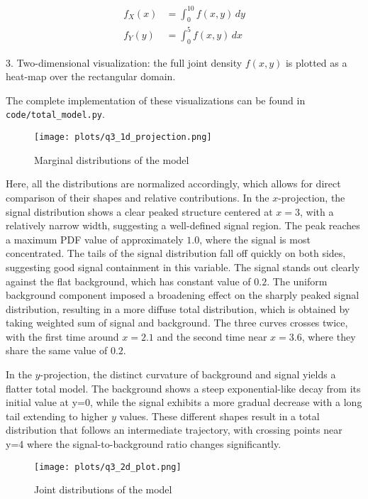 \documentclass[a4paper, 12pt]{article}
\begin{document}
   \begin{align}
   f_X(x) &= \int_0^{10} f(x,y) \, dy \\
   f_Y(y) &= \int_0^5 f(x,y) \, dx
   \end{align}
\par 
3. Two-dimensional visualization: the full joint density $f(x,y)$ is plotted as a heat-map over the rectangular domain. \par 
The complete implementation of these visualizations can be found in \texttt{code/total\_model.py}.
\begin{figure}[H]
    \centering
    \texttt{[image: plots/q3\_1d\_projection.png]}
    \caption{Marginal distributions of the model}
    \label{fig:marginal_distributions}
\end{figure}
\par Here, all the distributions are normalized accordingly, which allows for direct comparison of their shapes and relative contributions. In the $x$-projection, the signal distribution shows a clear peaked structure centered at $x=3$, with a relatively narrow width, suggesting a well-defined signal region. The peak reaches a maximum PDF value of approximately $1.0$, where the signal is most concentrated. The tails of the signal distribution fall off quickly on both sides, suggesting good signal containment in this variable. The signal stands out clearly against the flat background, which has constant value of $0.2$. The uniform background component imposed a broadening effect on the sharply peaked signal distribution, resulting in a more diffuse total distribution, which is obtained by taking weighted sum of signal and background. The three curves crosses twice, with the first time around $x=2.1$ and the second time near $x=3.6$, where they share the same value of $0.2$. 
\par In the $y$-projection, the distinct curvature of background and signal yields a flatter total model. The background shows a steep exponential-like decay from its initial value at y=0, while the signal exhibits a more gradual decrease with a long tail extending to higher $y$ values. These different shapes result in a total distribution that follows an intermediate trajectory, with crossing points near y=4 where the signal-to-background ratio changes significantly. 
\begin{figure}[H]
    \centering
    \texttt{[image: plots/q3\_2d\_plot.png]}
    \caption{Joint distributions of the model}
    \label{fig:marginal_distributions}
\end{figure}
\end{document}
